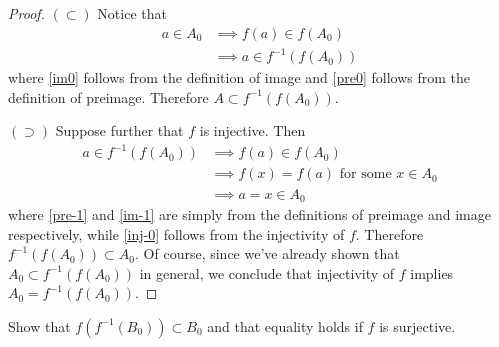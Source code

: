 \documentclass[11pt]{article}
\newenvironment{p}[1]{
  \begin{trivlist}
\item[\hskip \labelsep {\bfseries (#1)}]}
  {\end{trivlist}}
\begin{document}
\begin{proof}
$(\subset)$ Notice that
  \begin{align}
    a \in A_0
      &\implies f(a) \in f(A_0) \label{im0} \\
      &\implies a \in f^{-1}(f(A_0)) \label{pre0}
  \end{align}
  where \eqref{im0} follows from the definition of image and \eqref{pre0}
  follows from the definition of preimage. Therefore $A \subset
  f^{-1}(f(A_0))$.

  $(\supset)$ Suppose further that $f$ is injective. Then
  \begin{align}
    a \in f^{-1}(f(A_0))
      &\implies f(a) \in f(A_0) \label{pre-1} \\
      &\implies f(x) = f(a) \text{ for some } x \in A_0 \label{im-1} \\
      &\implies a = x \in A_0 \label{inj-0}
  \end{align}
  where \eqref{pre-1} and \eqref{im-1} are simply from the definitions of
  preimage and image respectively, while \eqref{inj-0} follows from the
  injectivity of $f$. Therefore $f^{-1}(f(A_0)) \subset A_0$. Of
  course, since we've already shown that $A_0 \subset f^{-1}(f(A_0))$ in
  general, we conclude that injectivity of $f$ implies $A_0 = f^{-1}(f(A_0))$.



\end{proof}

\begin{p}{b}
  Show that $f(f^{-1}(B_0)) \subset B_0$ and that equality holds if $f$ is surjective.
\end{p}
\end{document}
